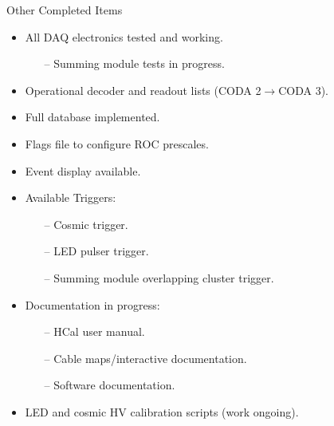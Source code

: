 \documentclass[10pt]{beamer}
\begin{document}
\begin{frame}{Other Completed Items}

    \begin{itemize}
        \item All DAQ electronics tested and working.
        \begin{itemize}
            \item[--] \alert{Summing module tests in progress.}
        \end{itemize}
        \item Operational decoder and readout lists (CODA 2$\rightarrow$CODA 3).
        \item Full database implemented.
        \item Flags file to configure ROC prescales.
        \item Event display available.
        \item Available Triggers:
            \begin{itemize}
                \item[--] \alert{Cosmic trigger.}
                \item[--] \alert{LED pulser trigger.}
                \item[--] \alert{Summing module overlapping cluster trigger.}
            \end{itemize}
        \item Documentation in progress:
        		\begin{itemize}
        			\item[--] \alert{HCal user manual.}
        			\item[--] \alert{Cable maps/interactive documentation.}
        			\item[--] \alert{Software documentation.}
        		\end{itemize}
        	\item LED and cosmic HV calibration scripts (work ongoing).
    \end{itemize}

\end{frame}
\end{document}
